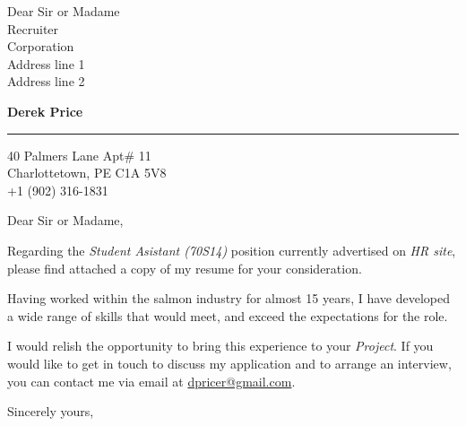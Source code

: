 \documentclass[12pt]{letter} %
\begin{document}
\signature{Derek Price, \emph{DVM}}           %
\longindentation=0pt                       %
\let\raggedleft\raggedright                %
 
 
\begin{letter}{Dear Sir or Madame \\
Recruiter \\
Corporation \\
Address line 1 \\
Address line 2}

\begin{center}
{\large\bf Derek Price} 
\end{center}
\medskip\hrule height 1pt
\begin{center}
{40 Palmers Lane Apt\# 11 \\ 
Charlottetown, PE C1A 5V8 \\ 
+1 (902) 316-1831} 
\end{center} \vfill %
 
 
\opening{Dear Sir or Madame,} 
 
\noindent Regarding the \emph{Student Asistant (70S14)} position currently advertised on \emph{HR site}, please find attached a copy of my resume for your consideration.
 
\noindent Having worked within the salmon industry for almost 15 years, I have developed a wide range of skills that would meet, and exceed the expectations for the role.  
 
\noindent I would relish the opportunity to bring this experience to your \emph{Project}. If you would like to get in touch to discuss my application and to arrange an interview, you can contact me via email at \href{mailto:dpricer@gmail.com}{dpricer@gmail.com}. 

\closing{Sincerely yours,} 


 

\end{letter}
 
\end{document}
